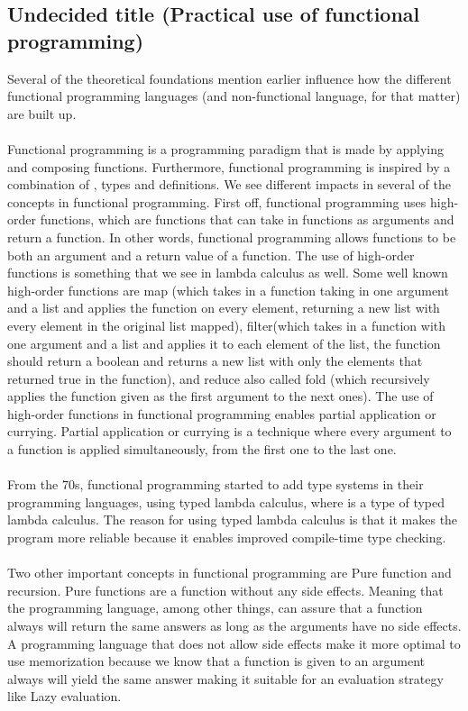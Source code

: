 \subsection{Undecided title (Practical use of functional programming)}
Several of the theoretical foundations mention earlier
influence how the different functional programming languages (and non-functional language, for that matter) are built up.
\\ \\
Functional programming is a programming paradigm that is made by applying and composing functions. Furthermore, 
functional programming is inspired by a combination of , types and definitions. We see  different impacts in several
of the concepts in functional programming. 
First off, functional programming uses high-order functions, which are functions that can take in functions as arguments
and return a function. In other words, functional programming allows functions to be both an argument and a return value of a function. 
The use of high-order functions is something that we see in lambda calculus as well. Some well known high-order functions are map 
(which takes in a function taking in one argument and a list and applies the function on every element, returning 
a new list with every element in the original list mapped), 
filter(which takes in a function with one argument and a list and applies it to each element of the list, the function should return a boolean and returns a new list with only the elements
that returned true in the function), and reduce also called fold (which recursively applies the function given as the first argument to the next ones). 
The use of high-order functions in functional programming enables partial application or currying. Partial application or currying is a technique
where every argument to a function is applied simultaneously, from the first one to the last one. 
\\ \\
From the 70s, functional programming started to add type systems in their programming languages,
using typed lambda calculus, where  is a type of typed lambda calculus. 
The reason for using typed lambda calculus is that it makes the program more reliable because it enables improved compile-time type checking.  
\\ \\
Two other important concepts in functional programming are Pure function and recursion. Pure functions are a function without any side effects. 
Meaning that the programming language, among other things, can assure that a function always will return the same answers as long as the arguments have no side effects. A programming language that does not allow 
side effects make it more optimal to use memorization because we know that a function is given to an argument always will yield the same answer 
making it suitable for an evaluation strategy like Lazy evaluation.